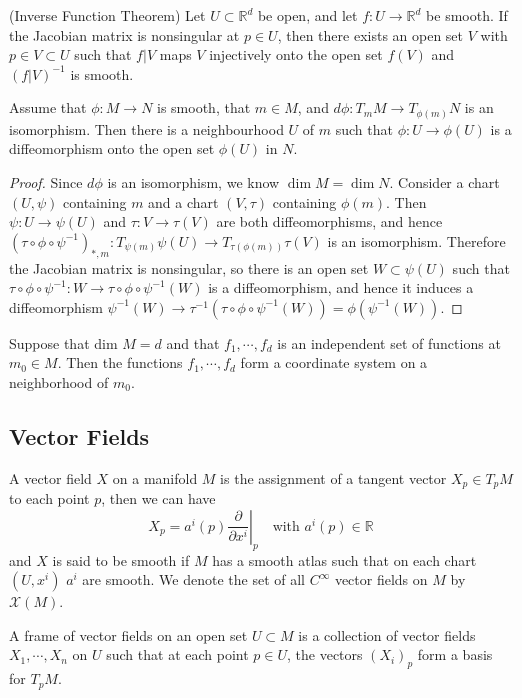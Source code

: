 \begin{theorem}
    (Inverse Function Theorem) Let $U\subset \mathbb{R}^d$ be open, and let $f:U\to\mathbb{R}^d$ be smooth. If the Jacobian matrix is nonsingular at $p \in U$, then there exists an open set $V$ with $p\in V\subset U$ such that $f|V$ maps $V$ injectively onto the open set $f(V)$ and $(f|V)^{-1}$ is smooth.
\end{theorem}

\begin{corollary}
    Assume that $\phi: M\to N$ is smooth, that $m\in M$, and $d\phi:T_mM \to T_{\phi(m)}N$ is an isomorphism. Then there is a neighbourhood $U$ of $m$ such that $\phi: U \to \phi(U)$ is a diffeomorphism onto the open set $\phi(U)$ in $N$.
\end{corollary}
\begin{proof}
    Since $d\phi$ is an isomorphism, we know $\dim M = \dim N$. Consider a chart $(U,\psi)$ containing $m$ and a chart $(V,\tau)$ containing $\phi(m)$. Then $\psi:U\to\psi(U)$ and $\tau:V\to\tau(V)$ are both diffeomorphisms, and hence $(\tau \circ \phi \circ \psi^{-1})_{*,m}:T_{\psi(m)} \psi(U) \to T_{\tau(\phi(m))}\tau(V)$ is an isomorphism. Therefore the Jacobian matrix is nonsingular, so there is an open set $W\subset \psi(U)$ such that $\tau \circ \phi \circ \psi^{-1}: W \to \tau \circ \phi \circ \psi^{-1}(W)$ is a diffeomorphism, and hence it induces a diffeomorphism $\psi^{-1}(W)\to \tau^{-1}(\tau \circ \phi \circ \psi^{-1}(W)) = \phi(\psi^{-1}(W))$.
\end{proof}

\begin{corollary}
    Suppose that dim $M=d$ and that $f_1,\cdots,f_d$ is an independent set of functions at $m_0 \in M$. Then the functions $f_1,\cdots,f_d$ form a coordinate system on a neighborhood of $m_0$. 
\end{corollary}


\subsection{Vector Fields}

\begin{definition}
    A vector field $X$ on a manifold $M$ is the assignment of a tangent vector $X_p \in T_p M$ to each point $p$, then we can have
    \[
        X_p = a^i(p)\left.\dfrac{\partial}{\partial x^i}\right|_p\quad\text{with }a^i(p)\in\mathbb{R}
    \]
    and $X$ is said to be smooth if $M$ has a smooth atlas such that on each chart $(U,x^i)$ $a^i$ are smooth. We denote the set of all $C^{\infty}$ vector fields on $M$ by $\mathscr{X}(M)$.\par
    A frame of vector fields on an open set $U\subset M$ is a collection of vector fields $X_1,\cdots, X_n$ on $U$ such that at each point $p \in U$, the vectors $(X_i)_p$ form a basis for $T_p M$.
\end{definition}

